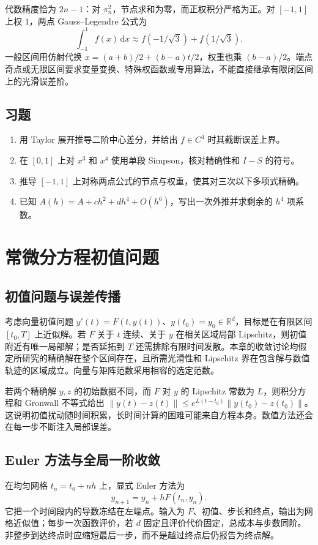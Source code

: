\documentclass[UTF8,12pt,a4paper,fontset=fandol]{ctexbook}
\begin{document}
代数精度恰为 $2n-1$：对 $\pi_n^2$，节点求和为零，而正权积分严格为正。对 $[-1,1]$ 上权 $1$，两点 Gauss--Legendre 公式为
\[
 \int_{-1}^1f(x)\,\mathrm dx\approx f(-1/\sqrt3)+f(1/\sqrt3).
\]
一般区间用仿射代换 $x=(a+b)/2+(b-a)t/2$，权重也乘 $(b-a)/2$。端点奇点或无限区间要求变量变换、特殊权函数或专用算法，不能直接继承有限闭区间上的光滑误差阶。

\section{习题}
\begin{enumerate}[label=\arabic*.]
\item\label{exr:na-quad-difference} 用 Taylor 展开推导二阶中心差分，并给出 $f\in C^4$ 时其截断误差上界。
\item\label{exr:na-quad-simpson} 在 $[0,1]$ 上对 $x^3$ 和 $x^4$ 使用单段 Simpson，核对精确性和 $I-S$ 的符号。
\item\label{exr:na-quad-gauss} 推导 $[-1,1]$ 上对称两点公式的节点与权重，使其对三次以下多项式精确。
\item\label{exr:na-quad-richardson} 已知 $A(h)=A+ch^2+dh^4+O(h^6)$，写出一次外推并求剩余的 $h^4$ 项系数。
\end{enumerate}

\chapter{常微分方程初值问题}
\label{chap:na-ode}

\section{初值问题与误差传播}
考虑向量初值问题 $y'(t)=F(t,y(t))$、$y(t_0)=y_0\in\mathbb R^d$，目标是在有限区间 $[t_0,T]$ 上近似解。若 $F$ 关于 $t$ 连续、关于 $y$ 在相关区域局部 Lipschitz，则初值附近有唯一局部解；是否延拓到 $T$ 还需排除有限时间发散。本章的收敛讨论均假定所研究的精确解在整个区间存在，且所需光滑性和 Lipschitz 界在包含解与数值轨迹的区域成立。向量与矩阵范数采用相容的选定范数。

若两个精确解 $y,z$ 的初始数据不同，而 $F$ 对 $y$ 的 Lipschitz 常数为 $L$，则积分方程和 Gronwall 不等式给出 $\|y(t)-z(t)\|\le e^{L(t-t_0)}\|y(t_0)-z(t_0)\|$。这说明初值扰动随时间积累，长时间计算的困难可能来自方程本身。数值方法还会在每一步不断注入局部误差。

\section{Euler 方法与全局一阶收敛}
在均匀网格 $t_n=t_0+nh$ 上，显式 Euler 方法为
\begin{equation}
 y_{n+1}=y_n+hF(t_n,y_n).
 \label{eq:na-euler}
\end{equation}
它把一个时间段内的导数冻结在左端点。输入为 $F$、初值、步长和终点，输出为网格近似值；每步一次函数评价，若 $d$ 固定且评价代价固定，总成本与步数同阶。非整步到达终点时应缩短最后一步，而不是越过终点后仍报告为终点解。
\end{document}
